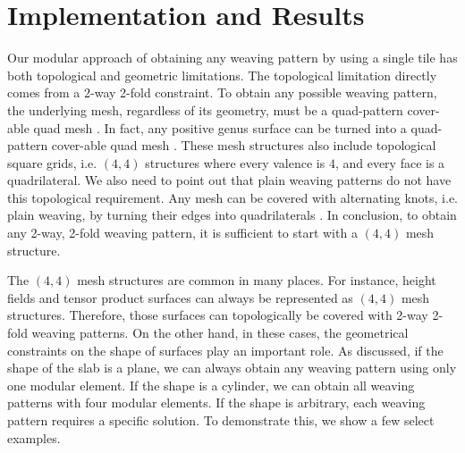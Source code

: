 \documentclass[times,twocolumn,final]{elsarticle}
\begin{document}
\section{Implementation and Results}

Our modular approach of obtaining any weaving pattern by using a single tile has both topological and geometric limitations. The topological limitation directly comes from a 2-way 2-fold constraint. To obtain any possible weaving pattern, the underlying mesh, regardless of its geometry, must be a quad-pattern cover-able quad mesh \cite{hu2012pattern}. In fact, any positive genus surface can be turned into a quad-pattern cover-able quad mesh \cite{hu2012pattern}. These mesh structures also include topological square grids, i.e. $(4,4)$ structures where every valence is $4$, and every face is a quadrilateral. We also need to point out that plain weaving patterns do not have this topological requirement. Any mesh can be covered with alternating knots, i.e. plain weaving, by turning their edges into quadrilaterals \cite{akleman2009cyclic,akleman2015extended,akleman2011cyclic,akleman2020topologically}. In conclusion, to obtain any 2-way, 2-fold weaving pattern, it is sufficient to start with a $(4,4)$ mesh structure. 

The $(4,4)$ mesh structures are common in many places. For instance, height fields and tensor product surfaces can always be represented as $(4,4)$ mesh structures. Therefore, those surfaces can topologically be covered with 2-way 2-fold weaving patterns. On the other hand, in these cases, the geometrical constraints on the shape of surfaces play an important role. As discussed, if the shape of the slab is a plane, we can always obtain any weaving pattern using only one modular element. If the shape is a cylinder, we can obtain all weaving patterns with four modular elements.  If the shape is arbitrary, each weaving pattern requires a specific solution. To demonstrate this, we show a few select examples.
\end{document}
